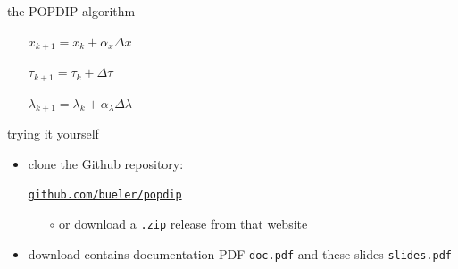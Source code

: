 \documentclass[10pt,hyperref,dvipsnames]{beamer}
\begin{document}
\begin{frame}{the \alert{POPDIP algorithm}}
\begin{itemize}
\begin{itemize}
\smallskip
    \item[] $x_{k+1} = x_k + \alpha_x \Delta x$

\smallskip
    \item[] $\tau_{k+1} = \tau_k + \Delta \tau$

\smallskip
    \item[] $\lambda_{k+1} = \lambda_k + \alpha_\lambda \Delta \lambda$
    \end{itemize}
\end{itemize}
\end{frame}


\begin{frame}{trying it yourself}

\begin{itemize}
\item clone the Github repository:

\begin{center}
\href{https://github.com/bueler/popdip}{\texttt{github.com/bueler/popdip}}
\end{center}

    \begin{itemize}
    \item[$\circ$] or download a \texttt{.zip} release from that website
    \end{itemize}

\item download contains documentation PDF \texttt{doc.pdf} and these slides \texttt{slides.pdf}
\end{itemize}
\end{frame}
\end{document}
